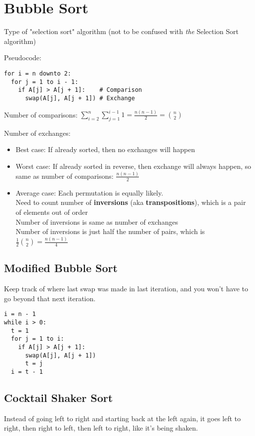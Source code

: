 \section{Bubble Sort}

Type of "selection sort" algorithm (not to be confused with \emph{the} Selection Sort algorithm)

Pseudocode:
\begin{verbatim}
for i = n downto 2:
  for j = 1 to i - 1:
    if A[j] > A[j + 1]:    # Comparison
      swap(A[j], A[j + 1]) # Exchange
\end{verbatim}

Number of comparisons: $\displaystyle \sum_{i=2}^n\sum_{j=1}^{i-1} 1 = \frac{n(n-1)}{2} = \binom{n}{2}$

Number of exchanges:
\begin{itemize}
    \item Best case: If already sorted, then no exchanges will happen
    \item Worst case: If already sorted in reverse, then exchange will always happen, so same as number of comparisons: $\frac{n(n-1)}{2}$
    \item Average case: Each permutation is equally likely.\\
    Need to count number of \textbf{inversions} (aka \textbf{transpositions}), which is a pair of elements out of order\\
    Number of inversions is same as number of exchanges\\
    Number of inversions is just half the number of pairs, which is $\displaystyle \frac 1 2 \binom n 2 = \frac{n(n-1)}{4}$
\end{itemize}

\subsection*{Modified Bubble Sort}

Keep track of where last swap was made in last iteration, and you won't have to go beyond that next iteration.

\begin{verbatim}
i = n - 1
while i > 0:
  t = 1
  for j = 1 to i:
    if A[j] > A[j + 1]:
      swap(A[j], A[j + 1])
      t = j
  i = t - 1
\end{verbatim}

\subsection*{Cocktail Shaker Sort}

Instead of going left to right and starting back at the left again, it goes left to right, then right to left, then left to right, like it's being shaken.

